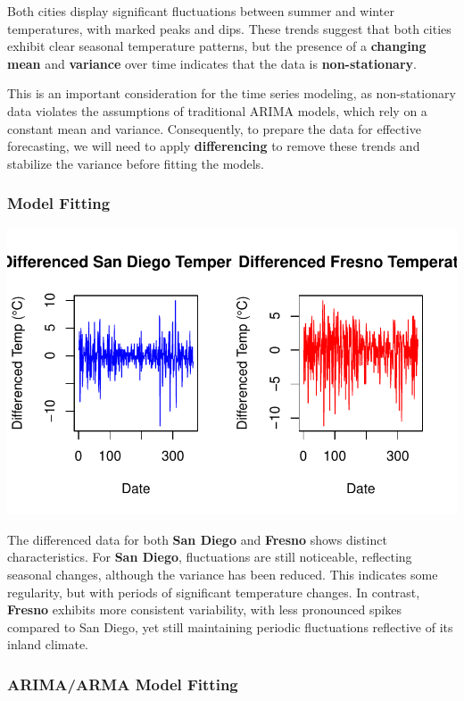 \documentclass[
  11pt,
]{article}
\begin{document}
Both cities display significant fluctuations between summer and winter
temperatures, with marked peaks and dips. These trends suggest that both
cities exhibit clear seasonal temperature patterns, but the presence of
a \textbf{changing mean} and \textbf{variance} over time indicates that
the data is \textbf{non-stationary}.

This is an important consideration for the time series modeling, as
non-stationary data violates the assumptions of traditional ARIMA
models, which rely on a constant mean and variance. Consequently, to
prepare the data for effective forecasting, we will need to apply
\textbf{differencing} to remove these trends and stabilize the variance
before fitting the models.

\subsubsection{Model Fitting}\label{model-fitting}

\includegraphics{project_files/figure-pdf/unnamed-chunk-82-1.pdf}

The differenced data for both \textbf{San Diego} and \textbf{Fresno}
shows distinct characteristics. For \textbf{San Diego}, fluctuations are
still noticeable, reflecting seasonal changes, although the variance has
been reduced. This indicates some regularity, but with periods of
significant temperature changes. In contrast, \textbf{Fresno} exhibits
more consistent variability, with less pronounced spikes compared to San
Diego, yet still maintaining periodic fluctuations reflective of its
inland climate.

\subsubsection{ARIMA/ARMA Model Fitting}\label{arimaarma-model-fitting}
\end{document}
